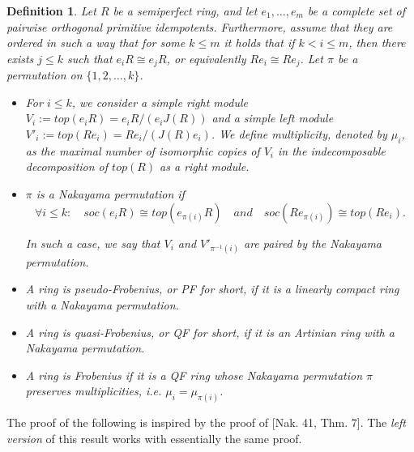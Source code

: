 \documentclass{article}
\theoremstyle{plain}
\theoremstyle{plain}
\newtheorem{Def}[veta]{Definition}
\theoremstyle{remark}
\theoremstyle{plain}
\begin{document}
\begin{Def}\label{DefQF}
    Let $R$ be a semiperfect ring, and let $e_1, \dots, e_m$ be a complete set of pairwise orthogonal primitive idempotents. Furthermore, assume that they are ordered in such a way that for some $k\leq m$ it holds that if $k<i\leq m$, then there exists $j\leq k$ such that $e_iR\cong e_jR$, or equivalently $Re_i\cong Re_j$.  Let $\pi$ be a permutation on $\{1,2,\dots, k\}$. 
    \begin{itemize}
    
\item For $i\leq k$, we consider a simple right module $V_i:=top(e_iR)=e_iR/(e_iJ(R))$ and a simple left module $V'_i:=top(Re_i)=Re_i/(J(R)e_i)$. We define  \emph{multiplicity}, denoted by $\mu_i$, as the maximal number of isomorphic copies of $V_i$ in the indecomposable decomposition of $top(R)$ as a right module.

    
   \item   $\pi$ is a \emph{Nakayama permutation } if   \[
    \forall i \leq k \colon \quad  soc(e_iR) \cong top(e_{\pi(i)}R) \quad and \quad  soc(Re_{\pi(i)}) \cong top(Re_{i}). \]

In such a case, we say that $V_i$ and $V'_{\pi^{-1}(i)}$ are \emph{paired by the Nakayama permutation}.


                 \item  A ring is \emph{pseudo-Frobenius}, or PF for short,  if it is a linearly compact ring with a Nakayama permutation.

       \item  A ring is \emph{quasi-Frobenius}, or QF for short,  if it is an Artinian ring with a Nakayama permutation.

   \item  A ring is \emph{Frobenius} if it is a QF ring whose Nakayama permutation $\pi$ \emph{preserves multiplicities}, i.e. $\mu_i=\mu_{\pi(i)}$.
        \end{itemize}
\end{Def}
The proof of the following is inspired by the proof of [Nak. 41, Thm. 7]. The \textit{left version} of this result works with essentially the same proof. 
\end{document}
